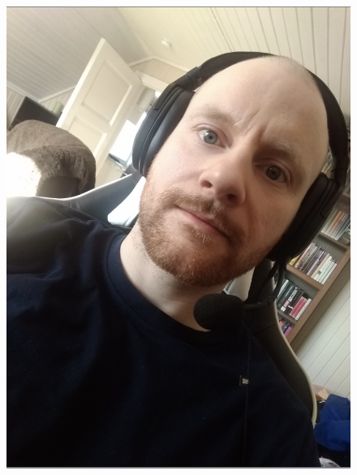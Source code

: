 \begin{figure}[h]
        {\includegraphics[scale = 0.2]{figures/0367.png}\hspace{1cm}}
    \subfloat

\end{figure}
